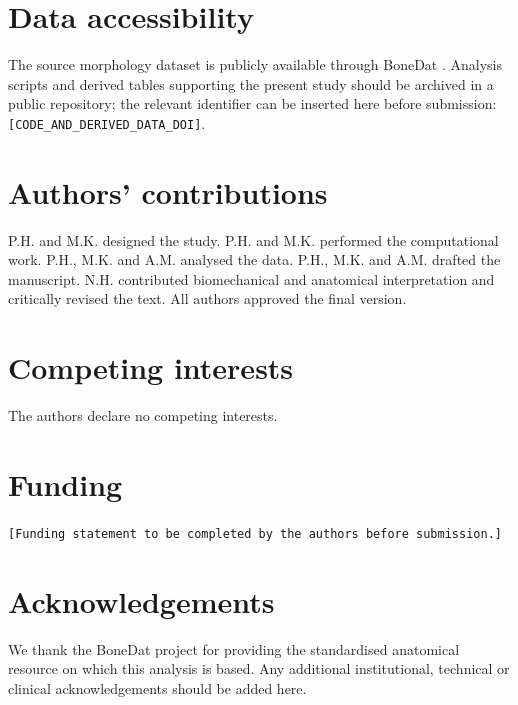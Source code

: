 \documentclass[11pt,a4paper]{article}
\begin{document}
\section*{Data accessibility}

The source morphology dataset is publicly available through BoneDat \citep{HenysKuchar2025}. Analysis scripts and derived tables supporting the present study should be archived in a public repository; the relevant identifier can be inserted here before submission: \texttt{[CODE\_AND\_DERIVED\_DATA\_DOI]}.

\section*{Authors' contributions}

P.H. and M.K. designed the study. P.H. and M.K. performed the computational work. P.H., M.K. and A.M. analysed the data. P.H., M.K. and A.M. drafted the manuscript. N.H. contributed biomechanical and anatomical interpretation and critically revised the text. All authors approved the final version.

\section*{Competing interests}

The authors declare no competing interests.

\section*{Funding}

\texttt{[Funding statement to be completed by the authors before submission.]}

\section*{Acknowledgements}

We thank the BoneDat project for providing the standardised anatomical resource on which this analysis is based. Any additional institutional, technical or clinical acknowledgements should be added here.

\clearpage
\end{document}
